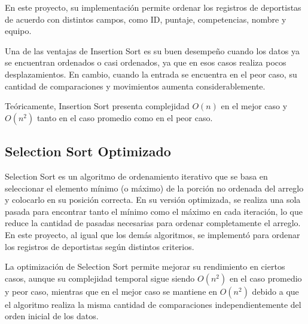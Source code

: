 En este proyecto, su implementación permite ordenar los registros de deportistas de acuerdo con distintos campos, como ID, puntaje, competencias, nombre y equipo.

Una de las ventajas de Insertion Sort es su buen desempeño cuando los datos ya se encuentran ordenados o casi ordenados, ya que en esos casos realiza pocos desplazamientos. En cambio, cuando la entrada se encuentra en el peor caso, su cantidad de comparaciones y movimientos aumenta considerablemente.

Teóricamente, Insertion Sort presenta complejidad \(O(n)\) en el mejor caso y \(O(n^2)\) tanto en el caso promedio como en el peor caso.

\subsection{Selection Sort Optimizado}
Selection Sort es un algoritmo de ordenamiento iterativo que se basa en seleccionar el elemento mínimo (o máximo) de la porción no ordenada del arreglo y colocarlo en su posición correcta. En su versión optimizada, se realiza una sola pasada para encontrar tanto el mínimo como el máximo en cada iteración, lo que reduce la cantidad de pasadas necesarias para ordenar completamente el arreglo.
En este proyecto, al igual que los demás algoritmos, se implementó para ordenar los registros de deportistas según distintos criterios.

La optimización de Selection Sort permite mejorar su rendimiento en ciertos casos, aunque su complejidad temporal sigue siendo \(O(n^2)\) en el caso promedio y peor caso, mientras que en el mejor caso se mantiene en \(O(n^2)\) debido a que el algoritmo realiza la misma cantidad de comparaciones independientemente del orden inicial de los datos.

